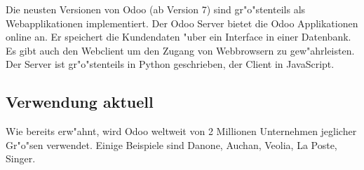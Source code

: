 Die neusten Versionen von Odoo (ab Version 7) sind gr"o"stenteils als Webapplikationen implementiert. Der Odoo Server bietet die Odoo Applikationen online an. Er speichert die Kundendaten "uber ein Interface in einer Datenbank. Es gibt auch den Webclient um den Zugang von Webbrowsern zu gew"ahrleisten. Der Server ist gr"o"stenteils in Python geschrieben, der Client in JavaScript.

\subsection{Verwendung aktuell}
Wie bereits erw"ahnt, wird Odoo weltweit von 2 Millionen Unternehmen jeglicher Gr"o"sen verwendet. Einige Beispiele sind Danone, Auchan, Veolia, La Poste, Singer.

